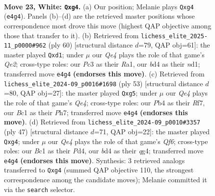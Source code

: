 \documentclass[11pt]{article}
\begin{document}
\clearpage

\begin{figure}[p]\centering
\begin{subfigure}{0.46\textwidth}\centering
\resizebox{\linewidth}{!}{%
\newchessgame
\chessboard[
  setfen={rq6/2p2kpp/3p4/8/pP1bQ1n1/2P5/P4PPP/1RB2K2 w - - 0 23},
  showmover=false,
  pgfstyle=straightmove, color=movearrow, markmove={e4-g4}
]}
\caption{}
\end{subfigure}\hfill
\begin{subfigure}{0.46\textwidth}\centering
\resizebox{\linewidth}{!}{%
\newchessgame
\chessboard[
  setfen={4r1k1/pbp2qb1/1p5p/5P2/2P5/1N4PB/PP2Qp1K/R2n4 w - - 0 31},
  showmover=false,
  pgfstyle=straightmove, color=movearrow, markmove={e2-d1}
]}
\caption{}
\end{subfigure}
\\[4pt]
\begin{subfigure}{0.46\textwidth}\centering
\resizebox{\linewidth}{!}{%
\newchessgame
\chessboard[
  setfen={4r1k1/5r1p/pQ4p1/4q1B1/2p5/5P2/PPN1B1PP/4R2K b - - 0 27},
  showmover=false,
  pgfstyle=straightmove, color=movearrow, markmove={e5-g5}
]}
\caption{}
\end{subfigure}\hfill
\begin{subfigure}{0.46\textwidth}\centering
\resizebox{\linewidth}{!}{%
\newchessgame
\chessboard[
  setfen={r5k1/p4ppp/8/2p5/N2p2Q1/5q2/PPP1rBRP/7K b - - 0 24},
  showmover=false,
  pgfstyle=straightmove, color=movearrow, markmove={f3-g4}
]}
\caption{}
\end{subfigure}
\caption{\textbf{Move 23, White: \texttt{Qxg4}.} (a) Our position; Melanie plays \texttt{Qxg4} (\texttt{e4g4}). Panels (b)--(d) are the retrieved master positions whose correspondence most drove this move (highest QAP objective among those that transfer to it). (b) Retrieved from \texttt{lichess\_elite\_2025-11\_p0000\#962} (ply 60) [structural distance $d$=79, QAP obj=61]: the master played \texttt{Qxd1}; under $\mu$ our \emph{Qe4} plays the role of that game's \emph{Qe2}; cross-type roles: our \emph{P}c3 as their \emph{R}a1, our \emph{b}d4 as their \emph{n}d1; transferred move \texttt{e4g4} \textbf{(endorses this move)}. (c) Retrieved from \texttt{lichess\_elite\_2024-09\_p0016\#1698} (ply 53) [structural distance $d$=80, QAP obj=27]: the master played \texttt{Qxg5}; under $\mu$ our \emph{Qe4} plays the role of that game's \emph{Qe4}; cross-type roles: our \emph{P}b4 as their \emph{R}f7, our \emph{B}c1 as their \emph{P}h7; transferred move \texttt{e4g4} \textbf{(endorses this move)}. (d) Retrieved from \texttt{lichess\_elite\_2024-09\_p0010\#3357} (ply 47) [structural distance $d$=71, QAP obj=22]: the master played \texttt{Qxg4}; under $\mu$ our \emph{Qe4} plays the role of that game's \emph{Qf6}; cross-type roles: our \emph{B}c1 as their \emph{P}d4, our \emph{b}d4 as their \emph{q}g4; transferred move \texttt{e4g4} \textbf{(endorses this move)}. Synthesis: 3 retrieved analogs transferred to \texttt{Qxg4} (summed QAP objective 110, the strongest correspondence among the candidate moves); Melanie committed it via the \texttt{search} selector.}
\label{fig:thought-m44}
\end{figure}
\end{document}
